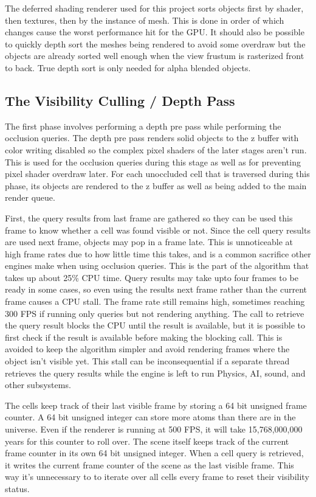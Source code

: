 \documentclass[12pt]{ucthesis}
\begin{document}
The deferred shading renderer used for this project sorts objects first by shader, then textures, then by the instance of mesh.
This is done in order of which changes cause the worst performance hit for the GPU.\cite{d3d10-sys}
It should also be possible to quickly depth sort the meshes being rendered to avoid some overdraw but the objects are already sorted well enough when the view frustum is rasterized front to back.
True depth sort is only needed for alpha blended objects.

\subsection {The Visibility Culling / Depth Pass}
\label{the-visibility-culling-depth-pass}
The first phase involves performing a depth pre pass while performing the occlusion queries.
The depth pre pass renders solid objects to the z buffer with color writing disabled so the complex pixel shaders of the later stages aren't run.
This is used for the occlusion queries during this stage as well as for preventing pixel shader overdraw later.
For each unoccluded cell that is traversed during this phase, its objects are rendered to the z buffer as well as being added to the main render queue.

First, the query results from last frame are gathered so they can be used this frame to know whether a cell was found visible or not.
Since the cell query results are used next frame, objects may pop in a frame late.
This is unnoticeable at high frame rates due to how little time this takes, and is a common sacrifice other engines make when using occlusion queries.
This is the part of the algorithm that takes up about 25\% CPU time.
Query results may take upto four frames to be ready in some cases, so even using the results next frame rather than the current frame causes a CPU stall.
The frame rate still remains high, sometimes reaching 300 FPS if running only queries but not rendering anything.
The call to retrieve the query result blocks the CPU until the result is available, but it is possible to first check if the result is available before making the blocking call.
This is avoided to keep the algorithm simpler and avoid rendering frames where the object isn't visible yet.
This stall can be inconsequential if a separate thread retrieves the query results while the engine is left to run Physics, AI, sound, and other subsystems.

The cells keep track of their last visible frame by storing a 64 bit unsigned frame counter.
A 64 bit unsigned integer can store more atoms than there are in the universe.
Even if the renderer is running at 500 FPS, it will take 15,768,000,000 years for this counter to roll over.
The scene itself keeps track of the current frame counter in its own 64 bit unsigned integer.
When a cell query is retrieved, it writes the current frame counter of the scene as the last visible frame.
This way it's unnecessary to to iterate over all cells every frame to reset their visibility status.
\end{document}
